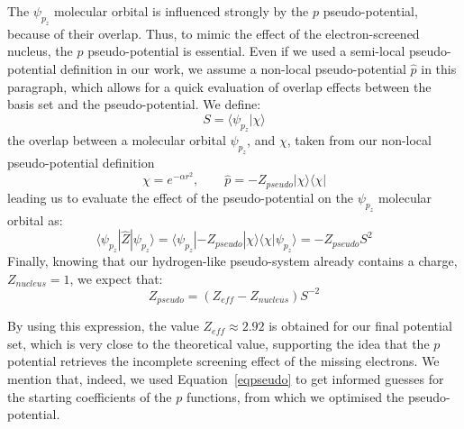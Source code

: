 \documentclass[12pt]{article}
\begin{document}
The \(\psi_{p_{z}}\) molecular orbital is influenced strongly by the $p$ pseudo-potential,
because of their overlap. Thus,
to mimic the effect of the electron-screened nucleus, the \(p\) pseudo-potential is essential. 
Even if we used a semi-local pseudo-potential definition in our work, 
we assume a non-local pseudo-potential $\widehat{p}$ in this paragraph, which allows 
for a quick evaluation of overlap effects between the basis set
and the pseudo-potential. We define:
\begin{equation}
S = \langle \psi_{p_{z}} | \chi \rangle
\end{equation}
the overlap between a molecular orbital \(\psi_{p_{z}}\), and \(\chi\), taken from our non-local pseudo-potential definition \cite{huzinaga_effective_1991}
\begin{equation}
\chi = e^{-\alpha r^{2}},\qquad \widehat{p} = -Z_{pseudo} | \chi \rangle \langle \chi |
\end{equation}
leading us to evaluate the effect of the pseudo-potential on the \(\psi_{p_{z}}\) molecular orbital as:
\begin{equation}
\langle \psi_{p_{z}} | \widehat{Z} | \psi_{p_{z}} \rangle = \langle \psi_{p_{z}} |-Z_{pseudo} | \chi \rangle \langle \chi | \psi_{p_{z}} \rangle = -Z_{pseudo} S^{2}
\end{equation}
Finally, knowing that our hydrogen-like pseudo-system already contains a charge, \(Z_{nucleus}=1\), 
we expect that:
\begin{equation}
Z_{pseudo} = (Z_{eff} - Z_{nucleus})S^{-2}
\label{eqpseudo}
\end{equation}

By using this expression, the value $Z_{eff} \approx 2.92$ is obtained for our final potential set, which is very close to the theoretical value, 
supporting the idea that the $p$ potential retrieves the incomplete screening effect of the missing electrons. 
We mention that, indeed, we used  Equation~\ref{eqpseudo} to get informed guesses for the starting coefficients of the $p$ functions,
from which we optimised the pseudo-potential. 

\end{document}
